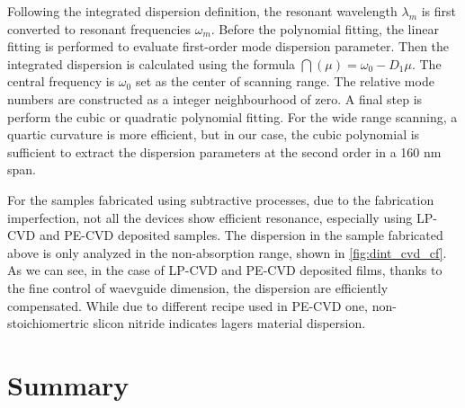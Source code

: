 Following the integrated dispersion definition, the resonant wavelength $\lambda_m$ is first converted to resonant frequencies $\omega_m$. Before the polynomial fitting, the linear fitting is performed to evaluate first-order mode dispersion parameter. Then the integrated dispersion is calculated using the formula $ \dint(\mu) = \omega_0 - D_1 \mu$. The central frequency is $\omega_0$ set as the center of scanning range. The relative mode numbers are constructed as a integer neighbourhood of zero. A final step is perform the cubic or quadratic polynomial fitting. For the wide range scanning, a quartic curvature is more efficient, but in our case, the cubic polynomial is sufficient to extract the dispersion parameters at the second order in a 160 nm span.

For the samples fabricated using subtractive processes, due to the fabrication imperfection, not all the devices show efficient resonance, especially using LP-CVD and PE-CVD deposited samples. The dispersion in the sample fabricated above is only analyzed in the non-absorption range, shown in \autoref{fig:dint_cvd_cf}. As we can see, in the case of LP-CVD and PE-CVD deposited films, thanks to the fine control of waevguide dimension, the dispersion are efficiently compensated. While due to different recipe used in PE-CVD one, non-stoichiomertric slicon nitride indicates lagers material dispersion.

\begin{figure}
	\centering
	
	\label{fig:dint_cvd_cf}
\end{figure}


\section{Summary}
